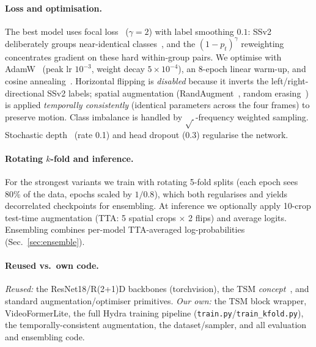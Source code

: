 \documentclass[10pt,twocolumn,letterpaper]{article}
\begin{document}
\paragraph{Loss and optimisation.}
The best model uses focal loss~\cite{lin2017focal} ($\gamma{=}2$) with label
smoothing $0.1$: SSv2 deliberately groups near-identical
classes~\cite{goyal2017ssv2}, and the $(1{-}p_t)^\gamma$ reweighting
concentrates gradient on these hard within-group pairs. We optimise with
AdamW~\cite{loshchilov2019adamw} (peak lr $10^{-3}$, weight decay $5\times10^{-4}$),
an 8-epoch linear warm-up, and cosine annealing~\cite{loshchilov2017sgdr}.
Horizontal flipping is \emph{disabled} because it inverts the
left/right-directional SSv2 labels; spatial augmentation
(RandAugment~\cite{cubuk2020randaugment}, random erasing~\cite{zhong2020randomerase})
is applied \emph{temporally consistently} (identical parameters across the four
frames) to preserve motion. Class imbalance is handled by
$\sqrt{\,}$-frequency weighted sampling. Stochastic depth~\cite{huang2016stochdepth}
(rate 0.1) and head dropout (0.3) regularise the network.

\paragraph{Rotating $k$-fold and inference.}
For the strongest variants we train with rotating 5-fold splits (each epoch sees
80\% of the data, epochs scaled by $1/0.8$), which both regularises and yields
decorrelated checkpoints for ensembling. At inference we optionally apply
10-crop test-time augmentation (TTA: 5 spatial crops $\times$ 2 flips) and
average logits. Ensembling combines per-model TTA-averaged log-probabilities
(Sec.~\ref{sec:ensemble}).

\paragraph{Reused vs.\ own code.}
\emph{Reused:} the ResNet18/R(2+1)D backbones (torchvision), the TSM
\emph{concept}~\cite{lin2019tsm}, and standard augmentation/optimiser primitives.
\emph{Our own:} the TSM block wrapper, VideoFormerLite, the full Hydra training
pipeline (\texttt{train.py}/\texttt{train\_kfold.py}), the temporally-consistent
augmentation, the dataset/sampler, and all evaluation and ensembling code.
\end{document}
